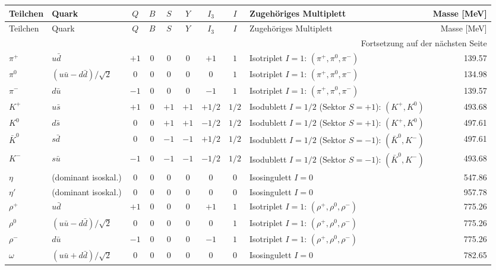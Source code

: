 \documentclass[10pt, letterpaper]{article}
\begin{document}
\begin{longtable}{@{}p{1.5cm}p{2cm}c c c c c c p{3.6cm}r@{}}
\toprule
Teilchen &
Quark &
$Q$ &
$B$ &
$S$ &
$Y$ &
$I_3$ &
$I$ &
Zugehöriges Multiplett &
Masse [MeV]
\\
\midrule
\endfirsthead

\toprule
Teilchen &
Quark &
$Q$ &
$B$ &
$S$ &
$Y$ &
$I_3$ &
$I$ &
Zugehöriges Multiplett &
Masse [MeV]
\\
\midrule
\endhead

\midrule
\multicolumn{10}{r}{\footnotesize Fortsetzung auf der nächsten Seite}
\\
\endfoot

\bottomrule
\endlastfoot

$\pi^+$ & $u\bar d$ & $+1$ & $0$ & $0$ & $0$ & $+1$ & $1$ &
Isotriplet $I=1$: $(\pi^+,\pi^0,\pi^-)$ & 139.57
\\
$\pi^0$ & $(u\bar u-d\bar d)/\sqrt2$ & $0$ & $0$ & $0$ & $0$ & $0$ & $1$ &
Isotriplet $I=1$: $(\pi^+,\pi^0,\pi^-)$ & 134.98
\\
$\pi^-$ & $d\bar u$ & $-1$ & $0$ & $0$ & $0$ & $-1$ & $1$ &
Isotriplet $I=1$: $(\pi^+,\pi^0,\pi^-)$ & 139.57
\\[2pt]

$K^+$ & $u\bar s$ & $+1$ & $0$ & $+1$ & $+1$ & $+1/2$ & $1/2$ &
Isodublett $I=1/2$ (Sektor $S=+1$): $(K^+,K^0)$ & 493.68
\\
$K^0$ & $d\bar s$ & $0$ & $0$ & $+1$ & $+1$ & $-1/2$ & $1/2$ &
Isodublett $I=1/2$ (Sektor $S=+1$): $(K^+,K^0)$ & 497.61
\\
$\bar K^0$ & $s\bar d$ & $0$ & $0$ & $-1$ & $-1$ & $+1/2$ & $1/2$ &
Isodublett $I=1/2$ (Sektor $S=-1$): $(\bar K^0,K^-)$ & 497.61
\\
$K^-$ & $s\bar u$ & $-1$ & $0$ & $-1$ & $-1$ & $-1/2$ & $1/2$ &
Isodublett $I=1/2$ (Sektor $S=-1$): $(\bar K^0,K^-)$ & 493.68
\\[2pt]

$\eta$ & (dominant isoskal.) & $0$ & $0$ & $0$ & $0$ & $0$ & $0$ &
Isosingulett $I=0$ & 547.86
\\
$\eta'$ & (dominant isoskal.) & $0$ & $0$ & $0$ & $0$ & $0$ & $0$ &
Isosingulett $I=0$ & 957.78
\\[6pt]

$\rho^+$ & $u\bar d$ & $+1$ & $0$ & $0$ & $0$ & $+1$ & $1$ &
Isotriplet $I=1$: $(\rho^+,\rho^0,\rho^-)$ & 775.26
\\
$\rho^0$ & $(u\bar u-d\bar d)/\sqrt2$ & $0$ & $0$ & $0$ & $0$ & $0$ & $1$ &
Isotriplet $I=1$: $(\rho^+,\rho^0,\rho^-)$ & 775.26
\\
$\rho^-$ & $d\bar u$ & $-1$ & $0$ & $0$ & $0$ & $-1$ & $1$ &
Isotriplet $I=1$: $(\rho^+,\rho^0,\rho^-)$ & 775.26
\\
$\omega$ & $(u\bar u+d\bar d)/\sqrt2$ & $0$ & $0$ & $0$ & $0$ & $0$ & $0$ &
Isosingulett $I=0$ & 782.65
\\[2pt]


\end{longtable}
\end{document}
